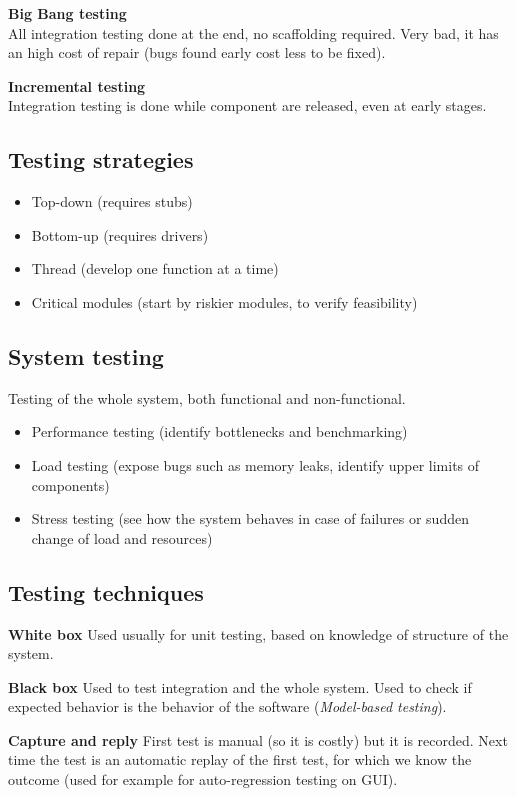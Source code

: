 \textbf{Big Bang testing}\\
All integration testing done at the end, no scaffolding required.
Very bad, it has an high cost of repair (bugs found early cost less to be fixed).

\textbf{Incremental testing}\\
Integration testing is done while component are released, even at early stages.

\subsection{Testing strategies}
\begin{itemize}
    \item Top-down (requires stubs)
    \item Bottom-up (requires drivers)
    \item Thread (develop one function at a time)
    \item Critical modules (start by riskier modules, to verify feasibility)
\end{itemize}

\subsection{System testing}
Testing of the whole system, both functional and non-functional.
\begin{itemize}
    \item Performance testing (identify bottlenecks and benchmarking)
    \item Load testing (expose bugs such as memory leaks, identify upper limits of components)
    \item Stress testing (see how the system behaves in case of failures or sudden change of load and resources)
\end{itemize}

\subsection{Testing techniques}
\textbf{White box} Used usually for unit testing, based on knowledge of structure of the system.

\textbf{Black box} Used to test integration and the whole system. Used to check if expected behavior is the behavior of the software (\emph{Model-based testing}).

\textbf{Capture and reply} First test is manual (so it is costly) but it is recorded. Next time the test is an automatic replay of the first test, for which we know the outcome (used for example for auto-regression testing on GUI).

